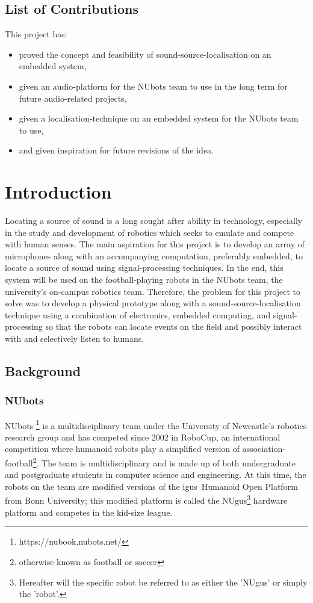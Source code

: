\documentclass[notitlepage]{report}
\begin{document}
\section*{List of Contributions}

This project has:
\begin{itemize}
	\item proved the concept and feasibility of sound-source-localisation on an embedded system,
	\item given an audio-platform for the NUbots team to use in the long term for future audio-related projects,
	\item given a localisation-technique on an embedded system for the NUbots team to use,
	\item and given inspiration for future revisions of the idea.
\end{itemize}

\tableofcontents

\chapter{Introduction}

Locating a source of sound is a long sought after ability in technology, especially in the study and development of robotics which seeks to emulate and compete with human senses. The main aspiration for this project is to develop an array of microphones along with an accompanying computation, preferably embedded, to locate a source of sound using signal-processing techniques. In the end, this system will be used on the football-playing robots in the NUbots team, the university's on-campus robotics team. Therefore, the problem for this project to solve was to develop a physical prototype along with a sound-source-localisation technique using a combination of electronics, embedded computing, and signal-processing so that the robots can locate events on the field and possibly interact with and selectively listen to humans.

\section{Background}

\subsection{NUbots}

NUbots \footnote{https://nubook.nubots.net/} is a multidisciplinary team under the University of Newcastle's robotics research group and has competed since 2002 in RoboCup, an international competition where humanoid robots play a simplified version of association-football\footnote{otherwise known as football or soccer}. The team is multidisciplinary and is made up of both undergraduate and postgraduate students in computer science and engineering. At this time, the robots on the team are modified versions of the igus\textregistered\ Humanoid Open Platform from Bonn University; this modified platform is called the NUgus\footnote{Hereafter will the specific robot be referred to as either the 'NUgus' or simply the 'robot'.} hardware platform and competes in the kid-size league.
\end{document}
